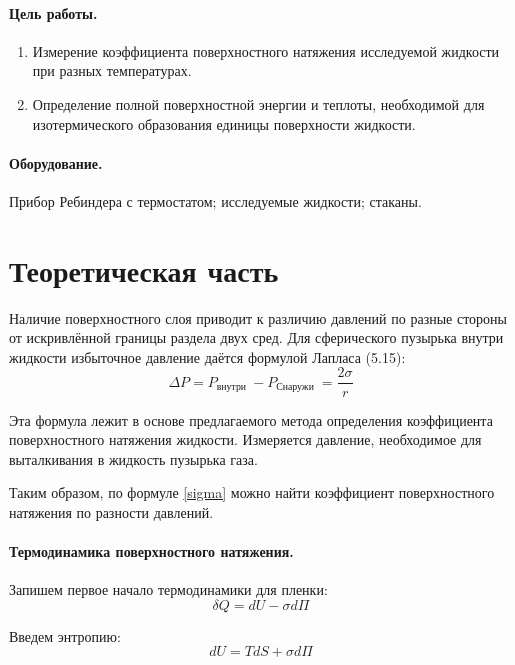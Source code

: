 \documentclass[12pt]{article}
\begin{document}
    \paragraph{Цель работы.}
    \begin{enumerate}
        \item Измерение коэффициента поверхностного натяжения исследуемой
        жидкости при разных температурах.
        \item Определение полной поверхностной энергии и теплоты, необходимой
        для изотермического образования единицы поверхности жидкости.
    \end{enumerate}
    \paragraph{Оборудование.}
    Прибор Ребиндера с термостатом; исследуемые жидкости; стаканы.

    \section{Теоретическая часть}
    Наличие поверхностного слоя приводит к различию давлений по разные стороны
    от искривлённой границы раздела двух сред. Для сферического пузырька внутри
    жидкости избыточное давление даётся формулой Лапласа (5.15):
    \begin{equation}
        \Delta P=P_{\text {внутри }}-P_{\text {Снаружи }}=\frac{2 \sigma}{r}
        \label{sigma}
    \end{equation}

    Эта формула лежит в основе предлагаемого метода определения коэффициента
    поверхностного натяжения жидкости. Измеряется давление, необходимое для
    выталкивания в жидкость пузырька газа.

    Таким образом, по формуле \ref{sigma} можно найти коэффициент
    поверхностного натяжения по разности давлений.

    \paragraph{Термодинамика поверхностного натяжения.}
    Запишем первое начало термодинамики для пленки:
    \begin{equation}
        \delta Q = dU - \sigma d\Pi
    \end{equation}

    Введем энтропию:
    \begin{equation}
        dU = TdS + \sigma d\Pi
        \label{dU}
    \end{equation}
\end{document}
